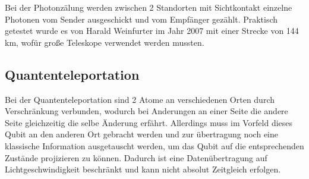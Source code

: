 Bei der Photonzälung werden zwischen 2 Standorten mit Sichtkontakt einzelne Photonen vom Sender ausgeschickt und vom Empfänger gezählt. Praktisch getestet wurde es von Harald Weinfurter im Jahr 2007 mit einer Strecke von 144 km, wofür große Teleskope verwendet werden mussten.

\subsection{Quantenteleportation}
\label{sec:Quantenteleportation}

Bei der Quantenteleportation sind 2 Atome an verschiedenen Orten durch Verschränkung verbunden, wodurch bei Anderungen an einer Seite die andere Seite gleichzeitig die selbe Änderung erfährt. Allerdings muss im Vorfeld dieses Qubit an den anderen Ort gebracht werden und zur übertragung noch eine klassische Information ausgetauscht werden, um das Qubit auf die entsprechenden Zustände projizieren zu können. Dadurch ist eine Datenübertragung auf Lichtgeschwindigkeit beschränkt und kann nicht absolut Zeitgleich erfolgen.




